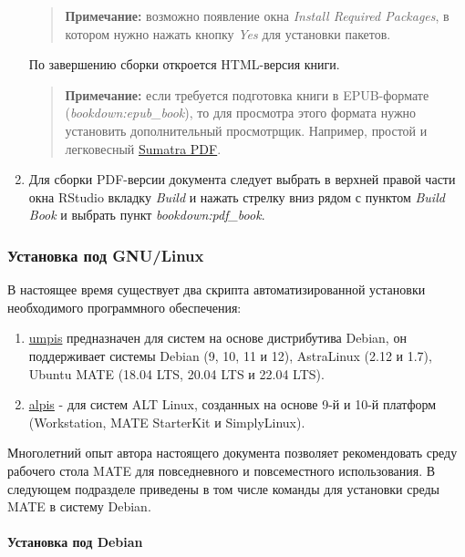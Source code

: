 \documentclass[
  a4paper,
]{book}
\providecommand{\tightlist}{%
  \setlength{\itemsep}{0pt}\setlength{\parskip}{0pt}}
\theoremstyle{definition}
\theoremstyle{definition}
\theoremstyle{definition}
\theoremstyle{definition}
\theoremstyle{remark}
\begin{document}
\begin{enumerate}
  \begin{quote}
  \textbf{Примечание:} возможно появление окна \emph{Install Required Packages},
  в котором нужно нажать кнопку \emph{Yes} для установки пакетов.
  \end{quote}

  По завершению сборки откроется HTML-версия книги.

  \begin{quote}
  \textbf{Примечание:} если требуется подготовка книги в EPUB-формате (\emph{bookdown:epub\_book}), то для просмотра этого формата
  нужно установить дополнительный просмотрщик. Например, простой и легковесный \href{https://www.sumatrapdfreader.org/dl/rel/3.4.6/SumatraPDF-3.4.6-64-install.exe}{Sumatra PDF}.
  \end{quote}
\item
  Для сборки PDF-версии документа следует выбрать в верхней правой части окна RStudio вкладку \emph{Build} и нажать стрелку вниз рядом с пунктом \emph{Build Book} и выбрать пункт \emph{bookdown:pdf\_book}.
\end{enumerate}

\subsubsection{Установка под GNU/Linux}\label{software-r-linux}

В настоящее время существует два скрипта автоматизированной установки необходимого программного обеспечения:

\begin{enumerate}
\def\labelenumi{\arabic{enumi}.}
\tightlist
\item
  \href{https://github.com/N0rbert/umpis}{umpis} предназначен для систем на основе дистрибутива Debian, он поддерживает системы Debian (9, 10, 11 и 12), AstraLinux (2.12 и 1.7), Ubuntu MATE (18.04 LTS, 20.04 LTS и 22.04 LTS).
\item
  \href{https://github.com/N0rbert/alpis}{alpis} - для систем ALT Linux, созданных на основе 9-й и 10-й платформ (Workstation, MATE StarterKit и SimplyLinux).
\end{enumerate}

Многолетний опыт автора настоящего документа позволяет рекомендовать среду рабочего стола MATE для повседневного и повсеместного использования. В следующем подразделе приведены в том числе команды для установки среды MATE в систему Debian.

\paragraph{Установка под Debian}\label{software-r-linux-debian}
\end{document}
